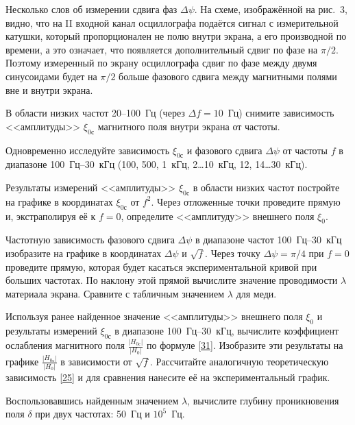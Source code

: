 Несколько слов об измерении сдвига фаз $\Delta\psi$. На схеме, изображённой на рис.~3, видно, что на II входной канал
осциллографа подаётся сигнал с измерительной катушки, который пропорционален не полю внутри экрана, а его производной по
времени, а это означает, что появляется дополнительный сдвиг по фазе на $\pi/2$. Поэтому измеренный по экрану
осциллографа сдвиг по фазе между двумя синусоидами будет на $\pi/2$ больше фазового сдвига между магнитными полями вне и
внутри экрана.

\begin{lab:task}
\item В области низких частот 20--100~Гц (через $\Delta f=10$~Гц) снимите зависимость <<амплитуды>> $\xi_{0с}$ магнитного поля
внутри экрана от частоты.

\item Одновременно исследуйте зависимость $\xi_{0с}$ и фазового сдвига $\Delta\psi$ от частоты $f$ в диапазоне 100~Гц--30~кГц
(100, 500, 1~кГц, 2\dots10~кГц, 12, 14\dots 30~кГц).


\item Результаты измерений <<амплитуды>> $\xi_{0с}$ в области низких частот постройте на графике в координатах $\xi_{0с}$
от $f^2$. Через отложенные точки проведите прямую и, экстраполируя её к $f=0$, определите <<амплитуду>> внешнего поля
$\xi_0$.

\item Частотную зависимость фазового сдвига $\Delta\psi$ в диапазоне частот 100~Гц--30~кГц изобразите на графике в координатах
$\Delta\psi$ и $\sqrt{f}$. Через точку $\Delta\psi=\pi/4$ при $f=0$ проведите прямую, которая будет касаться экспериментальной
кривой при больших частотах. По наклону этой прямой вычислите значение проводимости $\lambda$ материала экрана. Сравните с
табличным значением $\lambda$ для меди.

\item Используя ранее найденное значение <<амплитуды>> внешнего поля $\xi_0$ и результаты измерений $\xi_{0с}$ в диапазоне
100~Гц--30~кГц, вычислите коэффициент ослабления магнитного поля $\frac{|H_{0с}|}{|H_0|}$ по формуле \eqref{31}. Изобразите
эти результаты на графике $\frac{|H_{0с}|}{|H_0|}$ в зависимости от $\sqrt{f}$. Рассчитайте аналогичную теоретическую
зависимость \eqref{25} и для сравнения нанесите её на экспериментальный график.

\item Воспользовавшись найденным значением $\lambda$, вычислите глубину проникновения поля $\delta$ при двух частотах: 50~Гц и
$10^5$~Гц.
\end{lab:task}


